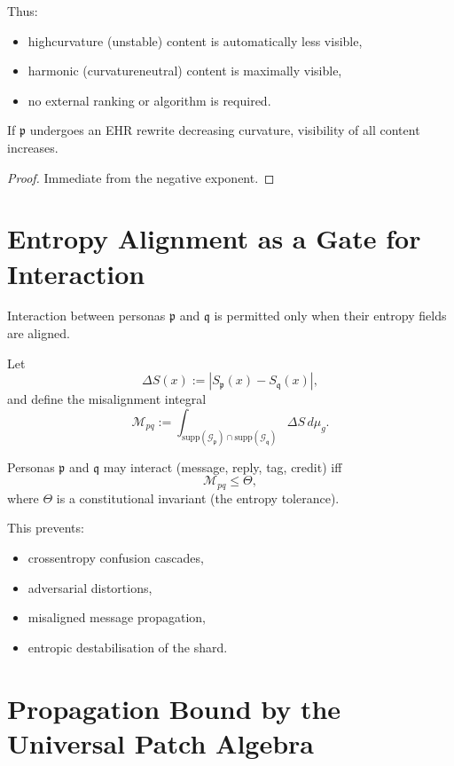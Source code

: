 Thus:
\begin{itemize}
    \item high\textendash curvature (unstable) content is automatically less visible,
    \item harmonic (curvature\textendash neutral) content is maximally visible,
    \item no external ranking or algorithm is required.
\end{itemize}

\begin{proposition}
If $\mathfrak{p}$ undergoes an EHR rewrite decreasing curvature,
visibility of all content increases.
\end{proposition}

\begin{proof}
Immediate from the negative exponent.
\end{proof}

\section{Entropy Alignment as a Gate for Interaction}

Interaction between personas $\mathfrak{p}$ and $\mathfrak{q}$
is permitted only when their entropy fields are aligned.

Let
\[
\Delta S(x) := |S_{\mathfrak{p}}(x) - S_{\mathfrak{q}}(x)|,
\]
and define the misalignment integral
\[
\mathcal{M}_{pq}
  := \int_{\mathrm{supp}(\mathcal{G}_{\mathfrak{p}}) 
          \cap \mathrm{supp}(\mathcal{G}_{\mathfrak{q}})}
         \Delta S \, d\mu_g.
\]

\begin{definition}
Personas $\mathfrak{p}$ and $\mathfrak{q}$ may interact
(message, reply, tag, credit)
iff
\[
\mathcal{M}_{pq} \le \Theta,
\]
where $\Theta$ is a constitutional invariant (the entropy tolerance).
\end{definition}

This prevents:
\begin{itemize}
    \item cross\textendash entropy confusion cascades,
    \item adversarial distortions,
    \item misaligned message propagation,
    \item entropic destabilisation of the shard.
\end{itemize}

\section{Propagation Bound by the Universal Patch Algebra}

